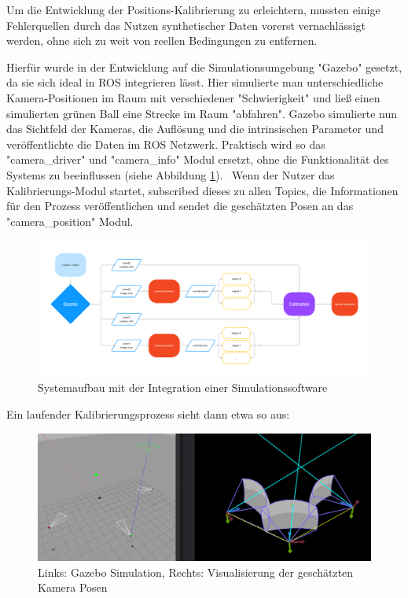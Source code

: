 \documentclass[12pt, ngerman]{article}
\begin{document}
Um die Entwicklung der Positions-Kalibrierung zu erleichtern, mussten einige Fehlerquellen durch das Nutzen synthetischer Daten vorerst vernachlässigt werden, ohne sich zu weit von reellen Bedingungen zu entfernen. 

Hierfür wurde in der Entwicklung auf die Simulationsumgebung "Gazebo" gesetzt, da sie sich ideal in ROS integrieren lässt. Hier simulierte man unterschiedliche Kamera-Positionen im Raum mit verschiedener "Schwierigkeit" und ließ einen simulierten grünen Ball eine Strecke im Raum "abfahren". Gazebo simulierte nun das Sichtfeld der Kameras, die Auflösung und die intrinsischen Parameter und veröffentlichte die Daten im ROS Netzwerk. Praktisch wird so das "camera\_driver" und "camera\_info" Modul ersetzt, ohne die Funktionalität des Systems zu beeinflussen (siehe Abbildung \ref{Abb: calibration-aufbau}). 
Wenn der Nutzer das Kalibrierungs-Modul startet, subscribed dieses zu allen Topics, die Informationen für den Prozess veröffentlichen und sendet die geschätzten Posen an das "camera\_position" Modul.

\begin{figure}[hbtp!]
    \includegraphics[width=\textwidth]{anytrack-calibration.png}
    \caption{Systemaufbau mit der Integration einer Simulationssoftware}
    \label{Abb: calibration-aufbau}
\end{figure}
Ein laufender Kalibrierungsprozess sieht dann etwa so aus:
\vspace{5pt}
\begin{figure}[hbtp!]
    \includegraphics[width=\textwidth]{simulation_calibration-2.png}
    \caption{Links: Gazebo Simulation, Rechts: Visualisierung der geschätzten Kamera Posen}
    \label{Abb: simulation-calibration}
\end{figure}
\end{document}
